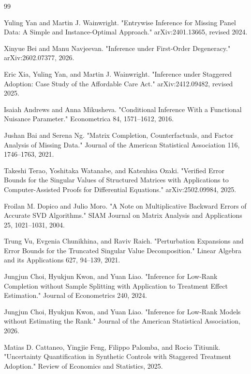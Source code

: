 \documentclass{article}
\begin{document}
\begin{thebibliography}{99}

   Yuling Yan and Martin J. Wainwright. "Entrywise Inference for Missing Panel Data: A Simple and Instance-Optimal Approach." arXiv:2401.13665, revised 2024.

   Xinyue Bei and Manu Navjeevan. "Inference under First-Order Degeneracy." arXiv:2602.07377, 2026.

   Eric Xia, Yuling Yan, and Martin J. Wainwright. "Inference under Staggered Adoption: Case Study of the Affordable Care Act." arXiv:2412.09482, revised 2025.

   Isaiah Andrews and Anna Mikusheva. "Conditional Inference With a Functional Nuisance Parameter." Econometrica 84, 1571--1612, 2016.

   Jushan Bai and Serena Ng. "Matrix Completion, Counterfactuals, and Factor Analysis of Missing Data." Journal of the American Statistical Association 116, 1746--1763, 2021.

   Takeshi Terao, Yoshitaka Watanabe, and Katsuhisa Ozaki. "Verified Error Bounds for the Singular Values of Structured Matrices with Applications to Computer-Assisted Proofs for Differential Equations." arXiv:2502.09984, 2025.

   Froilan M. Dopico and Julio Moro. "A Note on Multiplicative Backward Errors of Accurate SVD Algorithms." SIAM Journal on Matrix Analysis and Applications 25, 1021--1031, 2004.

   Trung Vu, Evgenia Chunikhina, and Raviv Raich. "Perturbation Expansions and Error Bounds for the Truncated Singular Value Decomposition." Linear Algebra and its Applications 627, 94--139, 2021.

   Jungjun Choi, Hyukjun Kwon, and Yuan Liao. "Inference for Low-Rank Completion without Sample Splitting with Application to Treatment Effect Estimation." Journal of Econometrics 240, 2024.

   Jungjun Choi, Hyukjun Kwon, and Yuan Liao. "Inference for Low-Rank Models without Estimating the Rank." Journal of the American Statistical Association, 2026.

   Matias D. Cattaneo, Yingjie Feng, Filippo Palomba, and Rocio Titiunik. "Uncertainty Quantification in Synthetic Controls with Staggered Treatment Adoption." Review of Economics and Statistics, 2025.


\end{thebibliography}
\end{document}
